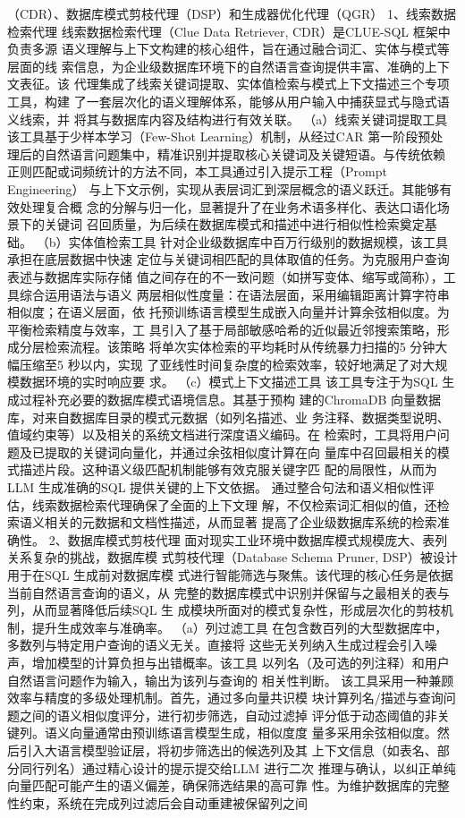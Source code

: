 \documentclass[12pt,a4paper,openright,UTF8]{ctexbook}
\begin{document}
（CDR）、数据库模式剪枝代理（DSP）和生成器优化代理（QGR） 1、线索数据检索代理 线索数据检索代理（Clue Data Retriever, CDR）是CLUE-SQL 框架中负责多源 语义理解与上下文构建的核心组件，旨在通过融合词汇、实体与模式等层面的线 索信息，为企业级数据库环境下的自然语言查询提供丰富、准确的上下文表征。该 代理集成了线索关键词提取、实体值检索与模式上下文描述三个专项工具，构建 了一套层次化的语义理解体系，能够从用户输入中捕获显式与隐式语义线索，并 将其与数据库内容及结构进行有效关联。 （a）线索关键词提取工具 该工具基于少样本学习（Few-Shot Learning）机制，从经过CAR 第一阶段预处 理后的自然语言问题集中，精准识别并提取核心关键词及关键短语。与传统依赖 正则匹配或词频统计的方法不同，本工具通过引入提示工程（Prompt Engineering） 与上下文示例，实现从表层词汇到深层概念的语义跃迁。其能够有效处理复合概 念的分解与归一化，显著提升了在业务术语多样化、表达口语化场景下的关键词 召回质量，为后续在数据库模式和描述中进行相似性检索奠定基础。 （b）实体值检索工具 针对企业级数据库中百万行级别的数据规模，该工具承担在底层数据中快速 定位与关键词相匹配的具体取值的任务。为克服用户查询表述与数据库实际存储 值之间存在的不一致问题（如拼写变体、缩写或简称），工具综合运用语法与语义 两层相似性度量：在语法层面，采用编辑距离计算字符串相似度；在语义层面，依 托预训练语言模型生成嵌入向量并计算余弦相似度。为平衡检索精度与效率，工 具引入了基于局部敏感哈希的近似最近邻搜索策略，形成分层检索流程。该策略 将单次实体检索的平均耗时从传统暴力扫描的5 分钟大幅压缩至5 秒以内，实现 了亚线性时间复杂度的检索效率，较好地满足了对大规模数据环境的实时响应要 求。 （c）模式上下文描述工具 该工具专注于为SQL 生成过程补充必要的数据库模式语境信息。其基于预构 建的ChromaDB 向量数据库，对来自数据库目录的模式元数据（如列名描述、业 务注释、数据类型说明、值域约束等）以及相关的系统文档进行深度语义编码。在 检索时，工具将用户问题及已提取的关键词向量化，并通过余弦相似度计算在向 量库中召回最相关的模式描述片段。这种语义级匹配机制能够有效克服关键字匹 配的局限性，从而为LLM 生成准确的SQL 提供关键的上下文依据。 通过整合句法和语义相似性评估，线索数据检索代理确保了全面的上下文理 解，不仅检索词汇相似的值，还检索语义相关的元数据和文档性描述，从而显著 提高了企业级数据库系统的检索准确性。 2、数据库模式剪枝代理 面对现实工业环境中数据库模式规模庞大、表列关系复杂的挑战，数据库模 式剪枝代理（Database Schema Pruner, DSP）被设计用于在SQL 生成前对数据库模 式进行智能筛选与聚焦。该代理的核心任务是依据当前自然语言查询的语义，从 完整的数据库模式中识别并保留与之最相关的表与列，从而显著降低后续SQL 生 成模块所面对的模式复杂性，形成层次化的剪枝机制，提升生成效率与准确率。 （a）列过滤工具 在包含数百列的大型数据库中，多数列与特定用户查询的语义无关。直接将 这些无关列纳入生成过程会引入噪声，增加模型的计算负担与出错概率。该工具 以列名（及可选的列注释）和用户自然语言问题作为输入，输出为该列与查询的 相关性判断。 该工具采用一种兼顾效率与精度的多级处理机制。首先，通过多向量共识模 块计算列名/描述与查询问题之间的语义相似度评分，进行初步筛选，自动过滤掉 评分低于动态阈值的非关键列。语义向量通常由预训练语言模型生成，相似度度 量多采用余弦相似度。然后引入大语言模型验证层，将初步筛选出的候选列及其 上下文信息（如表名、部分同行列名）通过精心设计的提示提交给LLM 进行二次 推理与确认，以纠正单纯向量匹配可能产生的语义偏差，确保筛选结果的高可靠 性。为维护数据库的完整性约束，系统在完成列过滤后会自动重建被保留列之间 
\end{document}
